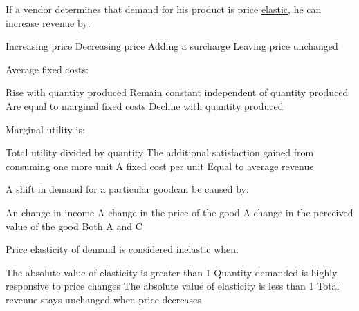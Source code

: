 \documentclass[12pt]{exam}
\begin{document}
\begin{questions}
  \begin{mcquestion}[2]
    If a vendor determines that demand for his product is price \underline{elastic}, he can increase revenue by:
    \begin{choices}
      \choice Increasing price
      \CorrectChoice Decreasing price
      \choice Adding a surcharge
      \choice Leaving price unchanged
    \end{choices}
  \end{mcquestion}

  \begin{mcquestion}[2]
    Average fixed costs:
    \begin{choices}
      \choice Rise with quantity produced
      \choice Remain constant independent of quantity produced
      \choice Are equal to marginal fixed costs
      \CorrectChoice Decline with quantity produced
    \end{choices}
  \end{mcquestion}

  \begin{mcquestion}[2]
    Marginal utility is:
    \begin{choices}
      \choice Total utility divided by quantity
      \CorrectChoice The additional satisfaction gained from consuming one more unit
      \choice A fixed cost per unit
      \choice Equal to average revenue
    \end{choices}
  \end{mcquestion}

  \begin{mcquestion}[2]
    A \underline{shift in demand} for a particular goodcan be caused by:
    \begin{choices}
      \choice An change in income
      \choice A change in the price of the good
      \choice A change in the perceived value of the good
      \CorrectChoice Both A and C
    \end{choices}
  \end{mcquestion}

  \begin{mcquestion}[2]
    Price elasticity of demand is considered \underline{inelastic} when:
    \begin{choices}
      \choice The absolute value of elasticity is greater than 1
      \choice Quantity demanded is highly responsive to price changes
      \CorrectChoice The absolute value of elasticity is less than 1
      \choice Total revenue stays unchanged when price decreases
    \end{choices}
  \end{mcquestion}


\end{questions}
\end{document}
